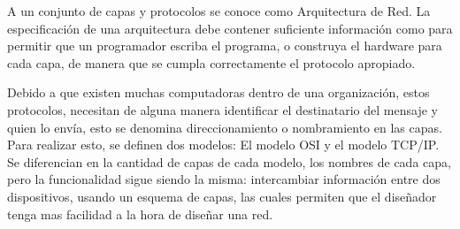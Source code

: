 A un conjunto de capas y protocolos se conoce como Arquitectura de Red. La especificación de una arquitectura debe contener suficiente información como para permitir que un programador escriba el programa, o construya el hardware para cada capa, de manera que se cumpla correctamente el protocolo apropiado.

Debido a que existen muchas computadoras dentro de una organización, estos protocolos, necesitan de alguna manera identificar el destinatario del mensaje y quien lo envía, esto se denomina direccionamiento o nombramiento en las capas. Para realizar esto, se definen dos modelos: El modelo OSI y el modelo TCP/IP. Se diferencian en la cantidad de capas de cada modelo, los nombres de cada capa, pero la funcionalidad sigue siendo la misma: intercambiar información entre dos dispositivos, usando un esquema de capas, las cuales permiten que el diseñador tenga mas facilidad a la hora de diseñar una red. 



